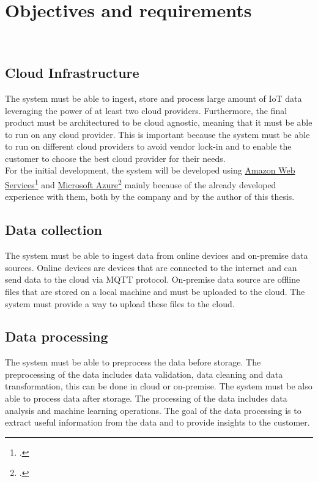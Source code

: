 \chapter{Objectives and requirements}
\label{cap:requirements}
\\

\section{Cloud Infrastructure}
The system must be able to ingest, store and process large amount of IoT data leveraging the power of at least two cloud providers. Furthermore, the final product must be architectured to be cloud agnostic, meaning that it must be able to run on any cloud provider. This is important because the system must be able to run on different cloud providers to avoid vendor lock-in and to enable the customer to choose the best cloud provider for their needs.\\
For the initial development, the system will be developed using \href{https://aws.amazon.com/it/}{Amazon Web Services}\footcite{site:aws} and \href{https://azure.microsoft.com/it-it/}{Microsoft Azure}\footcite{site:azure} mainly because of the already developed
experience with them, both by the company and by the author of this thesis.

\section{Data collection}
The system must be able to ingest data from online devices and on-premise data sources. 
Online devices are devices that are connected to the internet and can send data to the cloud via MQTT protocol.
On-premise data source are offline files that are stored on a local machine and must be uploaded to the cloud. The system must provide a way to upload these files to the cloud.
\section{Data processing}
The system must be able to preprocess the data before storage. The preprocessing of the data includes data validation, data cleaning and data transformation, this can be done in cloud or on-premise. The system must be also able to process data after storage. The processing of the data includes data analysis and machine learning operations. The goal of the data processing is to extract useful information from the data and to provide insights to the customer.\\ 

